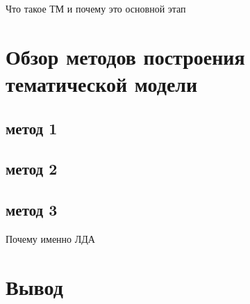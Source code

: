 Что такое ТМ и почему это основной этап

\section{Обзор методов построения тематической модели}
\label{sec:tm_techniques}

\subsection{метод 1}
\subsection{метод 2}
\subsection{метод 3}

Почему именно ЛДА

\section{Вывод}
\label{sec:overview_concl}

\blindtext